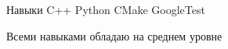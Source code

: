 
\begin{rubric}{Навыки}
\entry*[] C++
\entry*[] Python   
\entry*[] CMake
\entry*[] GoogleTest
\end{rubric}
Всеми навыками обладаю на среднем уровне
